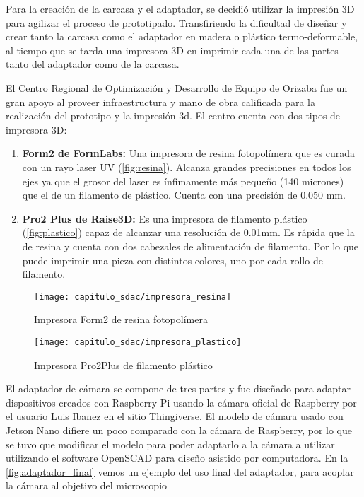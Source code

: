 Para la creación de la carcasa y el adaptador, se decidió utilizar la impresión
3D para agilizar el proceso de prototipado. Transfiriendo la dificultad de
diseñar y crear tanto la carcasa como el adaptador en madera o plástico
termo-deformable, al tiempo que se tarda una impresora 3D en imprimir cada una
de las partes tanto del adaptador como de la carcasa.

El Centro Regional de Optimización y Desarrollo de Equipo de Orizaba fue un gran
apoyo al proveer infraestructura y mano de obra calificada para la realización
del prototipo y la impresión 3d. El centro cuenta con dos tipos de impresora 3D:

\begin{enumerate}
    \item{\textbf{Form2 de FormLabs: }}  Una impresora de resina fotopolímera
    que es curada con un rayo laser UV (\autoref{fig:resina}). Alcanza grandes
    precisiones en todos los ejes ya que el grosor del laser es ínfimamente más
    pequeño (140 micrones) que el de un filamento de plástico. Cuenta con una
    precisión de 0.050 mm.
    \item{\textbf{Pro2 Plus de Raise3D: }} Es una impresora de filamento
    plástico (\autoref{fig:plastico}) capaz de alcanzar una resolución de
    0.01mm. Es rápida que la de resina y cuenta con dos cabezales de
    alimentación de filamento. Por lo que puede imprimir una pieza con distintos
    colores, uno por cada rollo de filamento. 
\end{enumerate}

\begin{figure}[H]
    \centering
    \texttt{[image: capitulo\_sdac/impresora\_resina]}
    \caption{Impresora Form2 de resina fotopolímera}\label{fig:resina}
\end{figure}

\begin{figure}[H]
    \centering
    \texttt{[image: capitulo\_sdac/impresora\_plastico]}
    \caption{Impresora Pro2Plus de filamento plástico}\label{fig:plastico}
\end{figure}

El adaptador de cámara se compone de tres partes y fue diseñado para adaptar
dispositivos creados con Raspberry Pi usando la cámara oficial de Raspberry por
el usuario \hyperlink{https://www.thingiverse.com/luisibanez/about}{Luis Ibanez}
en el sitio \hyperlink{https://www.thingiverse.com/}{Thingiverse}. El modelo de
cámara usado con Jetson Nano difiere un poco comparado con la cámara de
Raspberry, por lo que se tuvo que modificar el modelo para poder adaptarlo a la
cámara a utilizar utilizando el software OpenSCAD para diseño asistido por
computadora. En la \autoref{fig:adaptador_final} vemos un ejemplo del uso final
del adaptador, para acoplar la cámara al objetivo del microscopio

